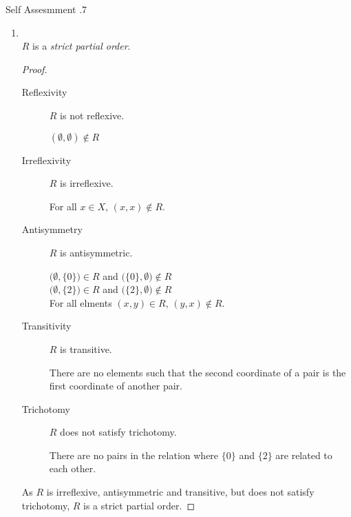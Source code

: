 \documentclass[../notes.tex]{subfiles}
\begin{document}
\begin{exercise}{Self Assesmment \thechapter.7}
\begin{enumerate}
							\begin{enumerate}[label=(\alph*)]
								\item {}\\
									$R$ is a \emph{strict partial order}.	
									\begin{proof}
										$ $
										\begin{description}
											\item[Reflexivity] $R$ is not reflexive.
												\begin{subproof}[Counterexample]
													$(\emptyset, \emptyset) \notin R$
												\end{subproof}
											\item[Irreflexivity] $R$ is irreflexive.
												\begin{subproof}
													For all $x \in X$, $(x, x) \notin R$.
												\end{subproof}
											\item[Antisymmetry] $R$ is antisymmetric.
												\begin{subproof}
													$\bigl(\emptyset, \{0\}\bigr) \in R$ and $\bigl(\{0\}, \emptyset\bigr) \notin R$\\
													$\bigl(\emptyset, \{2\}\bigr) \in R$ and $\bigl(\{2\}, \emptyset\bigr) \notin R$\\
													For all elments $(x, y) \in R$, $(y, x) \notin R$.
												\end{subproof}
											\item[Transitivity] $R$ is transitive.
												\begin{subproof}
													There are no elements such that the second coordinate of a pair is the first coordinate of another pair.
												\end{subproof}
											\item[Trichotomy] $R$ does not satisfy trichotomy.
												\begin{subproof}[Counterexample]
													There are no pairs in the relation where $\{0\}$ and $\{2\}$ are related to each other.
												\end{subproof}
										\end{description}
										As $R$ is irreflexive, antisymmetric and transitive, but does not satisfy trichotomy, $R$ is a strict partial order.
									\end{proof}

\end{enumerate}
\end{enumerate}
\end{exercise}
\end{document}
